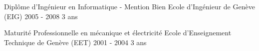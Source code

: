 
\begin{cventries}

  \cvedu
    {Diplôme d'Ingénieur en Informatique - Mention Bien}
    {Ecole d'Ingénieur de Genève (EIG)}
    {2005 - 2008}
    {3 ans}
    {}

  \cvedu
    {Maturité Professionnelle en mécanique et électricité}
    {Ecole d'Enseignement Technique de Genève (EET)}
    {2001 - 2004}
    {3 ans}
    {}

\end{cventries}

